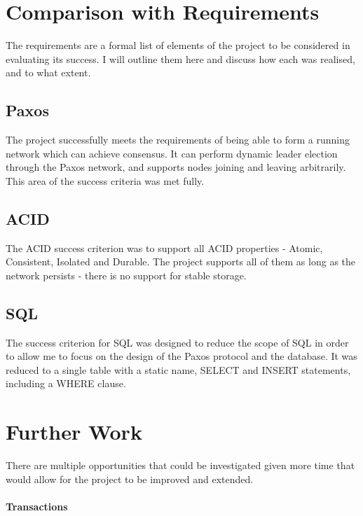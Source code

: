 \documentclass[12pt,twoside,notitlepage]{report}
\begin{document}
\section{Comparison with Requirements}

The requirements are a formal list of elements of the project to be
considered in evaluating its success. I will outline them here and discuss how each was realised,
and to what extent.

\subsection{Paxos}

The project successfully meets the requirements of being able to form a running network which can
achieve consensus. It can perform dynamic leader election through the Paxos network, and
supports nodes joining and leaving arbitrarily. This area of the success criteria was met fully.

\subsection{ACID}

The ACID success criterion was to support all ACID properties - Atomic, Consistent, Isolated and
Durable. The project supports all of them as long as the network persists - there is no support
for stable storage.

\subsection{SQL}

The success criterion for SQL was designed to reduce the scope of SQL in order to allow me to
focus on the design of the Paxos protocol and the database. It was reduced to a single table with
a static name, SELECT and INSERT statements, including a WHERE clause.

\section{Further Work}

There are multiple opportunities that could be investigated given more time that would allow for
the project to be improved and extended.

\paragraph{Transactions}
\end{document}
